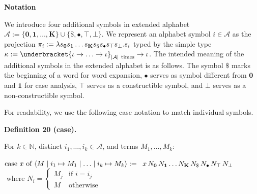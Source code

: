  
 
\par\medskip\noindent\textbf{Notation}\par
 
 
We introduce four additional symbols in extended alphabet $\mathcal{A}:=\{\mathbf{0},\mathbf{1},\ldots,\mathbf{K}\}\cup\{\$,\bullet,\top,\bot\}$. We represent an alphabet symbol $i\in\mathcal{A}$ as the projection $\pi_{i}:=\lambda s_{\mathbf{0}}s_{\mathbf{1}}\ldots s_{\mathbf{K}}s_{\$}s_{%
\bullet}s_{\top}s_{\bot}.s_{i}$ typed by the simple type $\kappa:=\underbracket{\iota\to\ldots\to\iota}_{|\mathcal{A}|\leavevmode%
\nobreak\ \text{times}}\to\iota$. The intended meaning of the additional symbols in the extended alphabet is as follows. The symbol $\$$ marks the beginning of a word for word expansion, $\bullet$ serves as symbol different from $\mathbf{0}$ and $\mathbf{1}$ for case analysis, $\top$ serves as a constructible symbol, and $\bot$ serves as a non-constructible symbol.\par
 
 
 
For readability, we use the following case notation to match individual symbols.\par
 
 
 
\par\medskip\noindent\textbf{Definition 20 (case).}\par
 
 
For $k\in\mathbb{N}$, distinct $i_{1},\ldots,i_{k}\in\mathcal{A}$, and terms $M_{1},\ldots,M_{k}$:\par
    $\displaystyle\textnormal{{case }}{x}\textnormal{{ of }}\langle M\mid i_{1}%
\mapsto M_{1}\mid\ldots\mid i_{k}\mapsto M_{k}\rangle:=$ $\displaystyle\leavevmode\nobreak\ x\,N_{\mathbf{0}}\,N_{\mathbf{1}}\ldots N_{%
\mathbf{K}}\,N_{\$}\,N_{\bullet}\,N_{\top}\,N_{\bot}$      $\displaystyle\text{ where }N_{i}=\begin{cases}M_{j}&\text{if }i=i_{j}\\
M&\text{otherwise}\end{cases}$    
 
 
